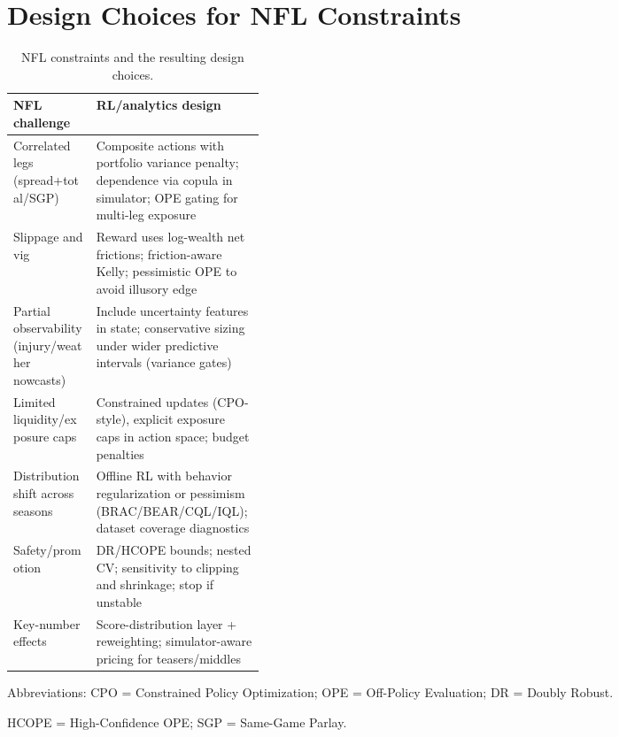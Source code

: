 \section{Design Choices for NFL Constraints}
\begin{table}[t]
  \centering
  \small
  \begingroup{}\hfuzz=1pt
  \begin{threeparttable}
    \caption{NFL constraints and the resulting design choices.}
    \label{tab:rl-mapping-nfl}
    \setlength{\tabcolsep}{4.5pt}\renewcommand{\arraystretch}{1.18}
    \begin{tabularx}{\linewidth}{@{} >{\RaggedRight\arraybackslash}p{0.33\linewidth} >{\RaggedRight\arraybackslash}X @{} }
      \toprule
      \textbf{NFL challenge}  & \textbf{RL/analytics design} \\
      \midrule
      Correlated legs (spread+total/SGP) & Composite actions with portfolio variance penalty; dependence via copula in simulator; OPE gating for multi-leg exposure \\
      Slippage and vig & Reward uses log-wealth net frictions; friction-aware Kelly; pessimistic OPE to avoid illusory edge \\
      Partial observability (injury/weather nowcasts) & Include uncertainty features in state; conservative sizing under wider predictive intervals (variance gates) \\
      Limited liquidity/exposure caps & Constrained updates (CPO-style), explicit exposure caps in action space; budget penalties \\
      Distribution shift across seasons & Offline RL with behavior regularization or pessimism (BRAC/BEAR/CQL/IQL); dataset coverage diagnostics \\
      Safety/promotion & DR/HCOPE bounds; nested CV; sensitivity to clipping and shrinkage; stop if unstable \\
      Key-number effects & Score-distribution layer + reweighting; simulator-aware pricing for teasers/middles \\
      \bottomrule
    \end{tabularx}
    \begin{tablenotes}[flushleft]\footnotesize\RaggedRight\sloppy
      \item Abbreviations: CPO = Constrained Policy Optimization; OPE = Off-Policy Evaluation; DR = Doubly Robust.
      \item HCOPE = High-Confidence OPE; SGP = Same-Game Parlay.
    \end{tablenotes}
  \end{threeparttable}
  \endgroup
\end{table}
\nocite{fujimoto2019,wu2019brac,kumar2019bear,kumar2020,kostrikov2021iql,fujimoto2021td3bc,nair2020awac}

